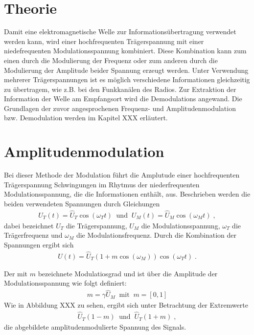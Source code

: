 \section{Theorie}
\label{sec:Theorie}

Damit eine elektromagnetische Welle zur Informationsübertragung verwendet werden kann, wird einer hochfrequenten Trägerspannung mit einer niedefrequenten Modulationsspannung kombiniert. Diese Kombination kann zum einen durch die Modulierung der Frequenz oder zum anderen durch die Modulierung der Amplitude beider Spannung erzeugt werden. Unter Verwendung mehrerer Trägerspannungen ist es möglich verschiedene Informationen gleichzeitig zu übertragem, wie z.B. bei den Funkkanälen des Radios. Zur Extraktion der Information der Welle am Empfangsort wird die Demodulations angewand. Die Grundlagen der zuvor angesprochenen Frequenz- und Amplitudenmodulation bzw. Demodulation werden im Kapitel XXX erläutert.

\section{Amplitudenmodulation}
\label{sec:Amplitudenmodulation}

Bei dieser Methode der Modulation führt die Amplutude einer hochfrequenten Trägerspannung Schwingungen im Rhytmus der niederfrequenten Modulationsspannung, die die Informationen enthält, aus. Beschrieben werden die beiden verwendeten Spannungen durch Gleichungen 
\begin{align}
	U_T(t)=\hat{U}_T\cos{(\omega_Tt)} \;\; \text{und} \;\; U_M(t)=\hat{U}_M\cos{(\omega_Mt)}\; ,
\end{align}
dabei bezeichnet $U_T$ die Trägerspannung, $U_M$ die Modulationsspannung, $\omega_T$ die Trägerfrequenz und $\omega_M$ die Modulationsfrequenz. Durch die Kombination der Spannungen ergibt sich
\begin{align}
	U(t)=\hat{U}_T(1+m\cos{(\omega_M)})\cos{(\omega_Tt)}\;.
\end{align}

Der mit $m$ bezeichnete Modulatiosgrad und ist über die Amplitude der Modulationsspannung wie folgt definiert:
\begin{align}
	m=\gamma\hat{U}_M \;\; \text{mit} \;\; m= [0,1]
\end{align}
Wie in Abbildung XXX zu sehen, ergibt sich unter Betrachtung der Extremwerte 
\begin{align}
	\hat{U}_T(1-m) \;\; \text{und} \;\; \hat{U}_T(1+m)\;,
\end{align}
die abgebildete amplitudenmodulierte Spannung des Signals. 


